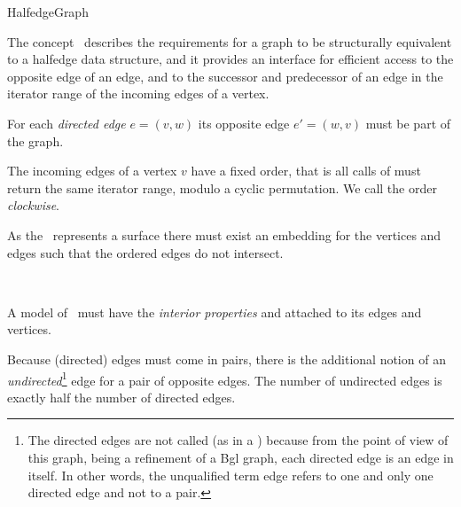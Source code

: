 
\begin{ccRefConcept}{HalfedgeGraph}


\ccDefinition

The concept \ccRefName\ describes the requirements for a graph to be
structurally equivalent to a halfedge data structure, and it provides
an interface for efficient access to the opposite edge of an edge, and
to the successor and predecessor of an edge in the iterator range of
the incoming edges of a vertex.



For each {\em directed edge} $e=(v,w)$ its opposite edge $e'=(w,v)$
must be part of the graph.

The incoming edges of a vertex $v$ have a fixed order, that is all
calls of  must return the same iterator range,
modulo a cyclic permutation. We call the order {\em clockwise}.

As the \ccRefName\ represents a surface there must exist an embedding
for the vertices and edges such that the ordered edges do not intersect.




\ccRefines
{}\\

A model of \ccRefName\ must have the {\em interior properties} 
 and  attached to its edges and vertices.




Because (directed) edges must come in pairs, there is the additional
notion of an {\em undirected}\footnote{
The directed edges are not called  (as in a
) because from the point of view of this graph, being
a refinement of a {\sc Bgl} graph, each directed edge is an
edge in itself. In other words, the unqualified term edge
refers to one and only one directed edge and not to a pair.}
% 
edge for a pair of opposite edges.
The number of undirected edges is exactly half the number of directed edges.


\end{ccRefConcept}
